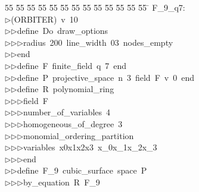 %
%
\begin{tabbing}
55 \= 55 \= 55 \= 55 \= 55 \= 55 \= 55 \= 55 \= 55 \= 55 \= 55 \= 55 \= 55 \= \kill
F\_9\_q7:\\[0pt]
$\triangleright$\>(ORBITER)\ v\ 10\ \\[0pt]
$\triangleright$\>$\triangleright$\>define\ Do\ draw\_options\ \\[0pt]
$\triangleright$\>$\triangleright$\>$\triangleright$\>radius\ 200\ line\_width\ 03\ nodes\_empty\ \\[0pt]
$\triangleright$\>$\triangleright$\>end\ \\[0pt]
$\triangleright$\>$\triangleright$\>define\ F\ finite\_field\ q\ 7\ end\ \\[0pt]
$\triangleright$\>$\triangleright$\>define\ P\ projective\_space\ n\ 3\ field\ F\ v\ 0\ end\ \\[0pt]
$\triangleright$\>$\triangleright$\>define\ R\ polynomial\_ring\ \\[0pt]
$\triangleright$\>$\triangleright$\>$\triangleright$\>field\ F\ \\[0pt]
$\triangleright$\>$\triangleright$\>$\triangleright$\>number\_of\_variables\ 4\ \\[0pt]
$\triangleright$\>$\triangleright$\>$\triangleright$\>homogeneous\_of\_degree\ 3\ \\[0pt]
$\triangleright$\>$\triangleright$\>$\triangleright$\>monomial\_ordering\_partition\ \\[0pt]
$\triangleright$\>$\triangleright$\>$\triangleright$\>variables\ x0x1x2x3\ x\_0x\_1x\_2x\_3\ \\[0pt]
$\triangleright$\>$\triangleright$\>$\triangleright$\>end\ \\[0pt]
$\triangleright$\>$\triangleright$\>define\ F\_9\ cubic\_surface\ space\ P\ \\[0pt]
$\triangleright$\>$\triangleright$\>$\triangleright$\>by\_equation\ R\ F\_9\ \\[0pt]

\end{tabbing}

